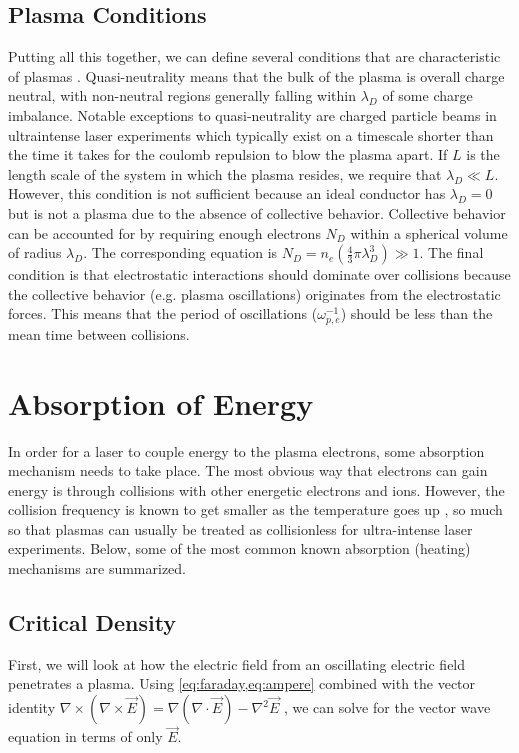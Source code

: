 \subsection{Plasma Conditions}
Putting all this together, we can define several conditions that are characteristic of plasmas \cite{Chen_2015_Plasma}. Quasi-neutrality means that the bulk of the plasma is overall charge neutral, with non-neutral regions generally falling within $\lambda_D$ of some charge imbalance. Notable exceptions to quasi-neutrality are charged particle beams in ultraintense laser experiments which typically exist on a timescale shorter than the time it takes for the coulomb repulsion to blow the plasma apart. If $L$ is the length scale of the system in which the plasma resides, we require that $\lambda_D \ll L$. However, this condition is not sufficient because an ideal conductor has $\lambda_D = 0$ but is not a plasma due to the absence of collective behavior. Collective behavior can be accounted for by requiring enough electrons $N_D$ within a spherical volume of radius $\lambda_D$. The corresponding equation is $N_D = n_e (\frac{4}{3} \pi \lambda_D^3) \gg 1$. The final condition is that electrostatic interactions should dominate over collisions because the collective behavior (e.g. plasma oscillations) originates from the electrostatic forces. This means that the period of oscillations ($\omega_{p,e}^{-1}$) should be less than the mean time between collisions. 

\section{Absorption of Energy} \label{sec:absorption}

In order for a laser to couple energy to the plasma electrons, some absorption mechanism needs to take place. The most obvious way that electrons can gain energy is through collisions with other energetic electrons and ions. However, the collision frequency is known to get smaller as the temperature goes up \cite{Gibbon_2005_Plasma}, so much so that plasmas can usually be treated as collisionless for ultra-intense laser experiments. Below, some of the most common known absorption (heating) mechanisms are summarized.

\subsection{Critical Density} \label{sec:critical_density}
First, we will look at how the electric field from an oscillating electric field penetrates a plasma. Using \cref{eq:faraday,eq:ampere} combined with the vector identity $\nabla \times (\nabla \times \vec{E}) = \nabla(\nabla \cdot \vec{E}) - \nabla^2 \vec{E}$ \cite{Zangwill_2012}, we can solve for the vector wave equation in terms of only $\vec{E}$. 

